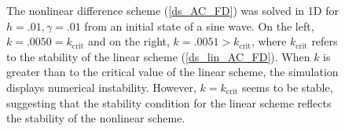 \documentclass[12pt, reqno]{report}
\theoremstyle{definition}
\theoremstyle{remark}
\begin{document}
\begin{figure}[H]
\begin{tabular}{cc}
    \end{tabular}

    \caption{The nonlinear difference scheme (\ref{ds_AC_FD}) was solved in 1D for $h=.01,\gamma=.01$ from an initial state of a sine wave. On the left, $k=.0050=k_\text{crit}$ and on the right, $k=.0051>k_\text{crit}$, where $k_\text{crit}$ refers to the stability of the linear scheme (\ref{ds_lin_AC_FD}). When $k$ is greater than to the critical value of the linear scheme, the simulation displays numerical instability. However, $k=k_\text{crit}$ seems to be stable, suggesting that the stability condition for the linear scheme reflects the stability of the nonlinear scheme.}
    \label{fg_nonlinear_stability_AC}
\end{figure}

\begin{figure}[H]
    \centering


\end{figure}
\end{document}

